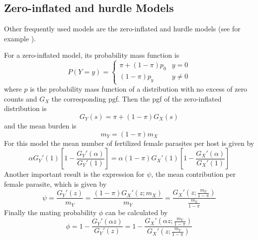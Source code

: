 \documentclass[useAMS,referee,usenatbib]{biom}
\begin{document}
\subsection{Zero-inflated and hurdle Models}
Other frequently used models  are the zero-inflated and hurdle models (see for example  \cite{abdybekova2012frequency,crofton1971quantitative,denwood2008distribution,ziadinov2010frequency}).

For a zero-inflated model, its probability mass function is 
\begin{equation*}\label{zid}
P(Y=y)= \left\{ \begin{array}{lc}
\pi + (1-\pi)p_0 & y=0 \\
(1-\pi)p_y  & y\neq 0
\end{array}
\right.
\end{equation*}
where $p$ is the probability mass function of a distribution with no excess of zero counts and $G_X$ the corresponding pgf. 
Then the pgf of the zero-inflated distribution is
\begin{equation*}
G_Y(s)=\pi+(1-\pi)G_X(s)
\end{equation*}
and the mean burden is  %
\begin{equation*}
m_Y=(1-\pi)m_X
\end{equation*}
For this model the mean number of fertilized female parasites per host is given by
\begin{equation*}
\alpha G_Y'(1) \left[1-  \frac{G_Y'(\alpha )}{ G_Y'(1)}\right]=\alpha (1-\pi) G_X'(1) 
\left[1 - \frac{G_X'(\alpha)}{G_X'(1)}\right]    
\end{equation*}
Another important result is the expression for $\psi$, the mean contribution per female parasite, which is given by
\begin{equation}\label{zipsi}
\psi= \frac{G_Y'(z)}{m_Y}=  \frac{(1-\pi)G_X'(z;m_X)}{m_Y}=\frac{G_X'\left( z;\frac{m_Y}{1-\pi}\right) }{\frac{m_Y}{1-\pi}} 
\end{equation}
Finally the mating probability $\phi$ can be calculated by     
\begin{equation}\label{ziphi}
\phi=1-\frac{G_Y'(\alpha z)}{G_Y'(z)}=1-\frac{G_X'\left(\alpha z;\frac{m_Y}{1-\pi}\right)}{G_X'\left( z;\frac{m_Y}{1-\pi}\right)} 
\end{equation}
\end{document}
